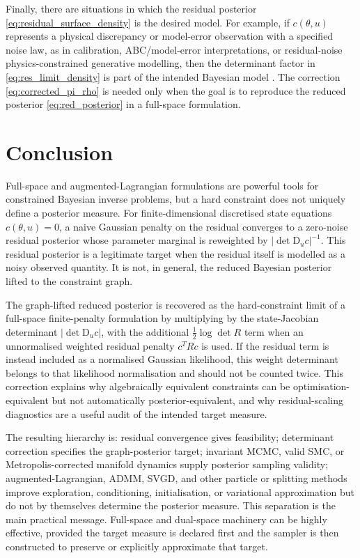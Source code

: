 \documentclass[11pt]{article}
\newcommand{\D}{\mathrm{D}}
\newcommand{\abs}[1]{\left\lvert #1\right\rvert}
\begin{document}
Finally, there are situations in which the residual posterior \eqref{eq:residual_surface_density} is the desired model. For example, if \(c(\theta,u)\) represents a physical discrepancy or model-error observation with a specified noise law, as in calibration, ABC/model-error interpretations, or residual-noise physics-constrained generative modelling, then the determinant factor in \eqref{eq:res_limit_density} is part of the intended Bayesian model \cite{KennedyOHagan2001,Wilkinson2013,XuZengPaisleyZhao2026}. The correction \eqref{eq:corrected_pi_rho} is needed only when the goal is to reproduce the reduced posterior \eqref{eq:red_posterior} in a full-space formulation.

\section{Conclusion}
\label{sec:conclusion}

Full-space and augmented-Lagrangian formulations are powerful tools for constrained Bayesian inverse problems, but a hard constraint does not uniquely define a posterior measure. For finite-dimensional discretised state equations \(c(\theta,u)=0\), a naive Gaussian penalty on the residual converges to a zero-noise residual posterior whose parameter marginal is reweighted by \(\abs{\det\D_u c}^{-1}\). This residual posterior is a legitimate target when the residual itself is modelled as a noisy observed quantity. It is not, in general, the reduced Bayesian posterior lifted to the constraint graph.

The graph-lifted reduced posterior is recovered as the hard-constraint limit of a full-space finite-penalty formulation by multiplying by the state-Jacobian determinant \(\abs{\det\D_u c}\), with the additional \(\frac12\log\det R\) term when an unnormalised weighted residual penalty \(c^TRc\) is used. If the residual term is instead included as a normalised Gaussian likelihood, this weight determinant belongs to that likelihood normalisation and should not be counted twice. This correction explains why algebraically equivalent constraints can be optimisation-equivalent but not automatically posterior-equivalent, and why residual-scaling diagnostics are a useful audit of the intended target measure.

The resulting hierarchy is: residual convergence gives feasibility; determinant correction specifies the graph-posterior target; invariant MCMC, valid SMC, or Metropolis-corrected manifold dynamics supply posterior sampling validity; augmented-Lagrangian, ADMM, SVGD, and other particle or splitting methods improve exploration, conditioning, initialisation, or variational approximation but do not by themselves determine the posterior measure. This separation is the main practical message. Full-space and dual-space machinery can be highly effective, provided the target measure is declared first and the sampler is then constructed to preserve or explicitly approximate that target.
\end{document}
